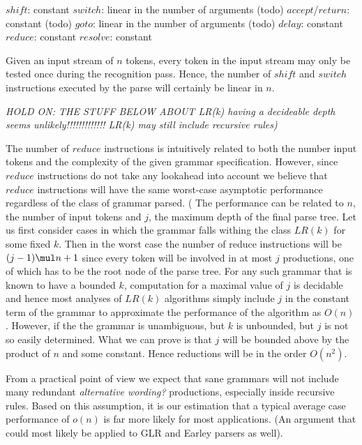 \documentclass[a4paper,11pt]{article}
\begin{document}
$shift$: constant
$switch$: linear in the number of arguments (todo)
$accept$/$return$: constant (todo)
$goto$: linear in the number of arguments (todo)
$delay$: constant
$reduce$: constant
$resolve$: constant

Given an input stream of $n$ tokens, every token in the input stream may only be tested once during the recognition pass.
Hence, the number of $shift$ and $switch$ instructions executed by the parse will certainly be linear in $n$.

\emph{HOLD ON: THE STUFF BELOW ABOUT LR(k) having a decideable depth seems unlikely!!!!!!!!!!!!! LR(k) may still include recursive rules)}

The number of $reduce$ instructions is intuitively related to both the number input tokens and the complexity of the given grammar specification.
However, since $reduce$ instructions do not take any lookahead into account we believe that $reduce$ instructions will have the same worst-case asymptotic
performance regardless of the class of grammar parsed. (
The performance can be related to $n$, the number of input tokens and $j$, the maximum depth of the final parse tree.
Let us first consider cases in which the grammar falls withing the class $LR(k)$ for some fixed $k$.
Then in the worst case the number of reduce instructions will be $(j - 1) \mul n + 1$ since every token will be involved in at most $j$ productions, one of which has to be the root node of the parse tree.
For any such grammar that is known to have a bounded $k$, computation for a maximal value of $j$ is decidable and hence most analyses of $LR(k)$ algorithms simply include $j$ in the constant term 
of the grammar to approximate the performance of the algorithm as $O(n)$.
However, if the the grammar is unambiguous, but $k$ is unbounded, but $j$ is not so easily determined. 
What we can prove is that $j$ will be bounded above by the product of $n$ and some constant.
Hence reductions will be in the order $O(n^2)$. 

From a practical point of view we expect that sane grammars will not include many redundant \emph{alternative wording?} productions, especially inside recursive rules.
Based on this assumption, it is our estimation that a typical average case performance of $o(n)$ is far more likely for most applications. (An argument that could most likely be applied to GLR and Earley parsers as well).
\end{document}
